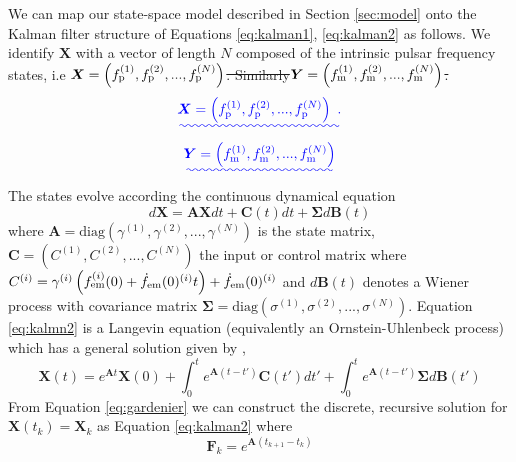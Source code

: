 \documentclass[fleqn,usenatbib,useAMS]{mnras}
\providecommand{\DIFadd}[1]{{\protect\color{blue}\uwave{#1}}} %
\providecommand{\DIFdel}[1]{{\protect\color{red}\sout{#1}}}                      %
\providecommand{\DIFaddbegin}{} %
\providecommand{\DIFaddend}{} %
\providecommand{\DIFdelbegin}{} %
\providecommand{\DIFdelend}{} %
\newcommand{\DIFscaledelfig}{0.5}
\newlength{\DIFdelgraphicswidth} %
\newlength{\DIFdelgraphicsheight} %
\newcommand{\DIFaddincludegraphics}[2][]{{\color{blue}\fbox{\DIFOincludegraphics[#1]{#2}}}} %
\newcommand{\DIFdelincludegraphics}[2][]{%
\sbox{\DIFdelgraphicsbox}{\DIFOincludegraphics[#1]{#2}}%
\settoboxwidth{\DIFdelgraphicswidth}{\DIFdelgraphicsbox} %
\settoboxtotalheight{\DIFdelgraphicsheight}{\DIFdelgraphicsbox} %
\scalebox{\DIFscaledelfig}{%
\parbox[b]{\DIFdelgraphicswidth}{\usebox{\DIFdelgraphicsbox}\\[-\baselineskip] \rule{\DIFdelgraphicswidth}{0em}}\llap{\resizebox{\DIFdelgraphicswidth}{\DIFdelgraphicsheight}{%
\setlength{\unitlength}{\DIFdelgraphicswidth}%
\begin{picture}(1,1)%
\thicklines\linethickness{2pt} %
{\color[rgb]{1,0,0}\put(0,0){\framebox(1,1){}}}%
{\color[rgb]{1,0,0}\put(0,0){\line( 1,1){1}}}%
{\color[rgb]{1,0,0}\put(0,1){\line(1,-1){1}}}%
\end{picture}%
}\hspace*{3pt}}} %
} %
\DeclareRobustCommand{\DIFaddbegin}{\DIFOaddbegin \let\includegraphics\DIFaddincludegraphics} %
\DeclareRobustCommand{\DIFaddend}{\DIFOaddend \let\includegraphics\DIFOincludegraphics} %
\DeclareRobustCommand{\DIFdelbegin}{\DIFOdelbegin \let\includegraphics\DIFdelincludegraphics} %
\DeclareRobustCommand{\DIFdelend}{\DIFOaddend \let\includegraphics\DIFOincludegraphics} %
\begin{document}
We can map our state-space model described in Section \ref{sec:model} onto the Kalman filter structure of Equations  
\eqref{eq:kalman1}, \eqref{eq:kalman2} as follows. We identify $\boldsymbol{X}$ with a vector of length $N$ composed of the intrinsic pulsar frequency states, i.e 
\DIFdelbegin \DIFdel{$\boldsymbol{X} = \left(f_{\rm p}^{(1)}, f_{\rm p}^{(2)}, ..., f_{\rm p}^{(N)}\right)$. Similarly$\boldsymbol{Y} = \left(f_{\rm m}^{(1)}, f_{\rm m}^{(2)}, ..., f_{\rm m}^{(N)} \right)$. }\DIFdelend \DIFaddbegin \begin{equation}
	\DIFadd{\boldsymbol{X} = \left(f_{\rm p}^{(1)}, f_{\rm p}^{(2)}, ..., f_{\rm p}^{(N)}\right) \ .
}\end{equation}
\DIFadd{Similarly,  
}\begin{equation}
\DIFadd{\boldsymbol{Y} = \left(f_{\rm m}^{(1)}, f_{\rm m}^{(2)}, ..., f_{\rm m}^{(N)} \right)
}\end{equation}
\DIFaddend The states evolve according the continuous dynamical equation
\begin{equation}
	d \boldsymbol{X} = \boldsymbol{A} \boldsymbol{X} dt + \boldsymbol{C}(t) dt + \boldsymbol{\Sigma} d \boldsymbol{B}(t) \label{eq:kalmn2}
\end{equation}
where $\boldsymbol{A} = \text{diag} \left(\gamma^{(1)}, \gamma^{(2)}, ..., \gamma^{(N)}\right)$ is the state matrix, $\boldsymbol{C} = \left(C^{(1)}, C^{(2)}, ..., C^{(N)}\right)$ the input or control matrix where $C^{(i)} =\gamma^{(i)} \left(f_{\rm em}^{(i)} (0) + \dot{f}_{\rm em}(0)^{(i)} t \right) +  \dot{f}_{\rm em}(0)^{(i)}$ and $d\boldsymbol{B}(t)$ denotes a Wiener process with covariance matrix $\boldsymbol{\Sigma} = \text{diag} \left(\sigma^{(1)}, \sigma^{(2)}, ..., \sigma^{(N)}\right)$. Equation \ref{eq:kalmn2} is a Langevin equation (equivalently an Ornstein-Uhlenbeck process) which has a general solution given by \citep{gardiner2009stochastic},
\begin{equation}
	\boldsymbol{X}(t) = e^{\boldsymbol{A} t} \boldsymbol{X}(0) + \int_0^t e^{\boldsymbol{A}(t-t')} \boldsymbol{C}(t') dt' + \int_0^t e^{\boldsymbol{A}(t-t')} \boldsymbol{\Sigma} d\boldsymbol{B}(t') \label{eq:gardenier}
\end{equation} 
From Equation \eqref{eq:gardenier} we can construct the discrete, recursive solution for $\boldsymbol{X}(t_k) = \boldsymbol{X}_k$ as Equation \eqref{eq:kalman2} where
\begin{equation}
\boldsymbol{F}_k = e^{\boldsymbol{A}\left( t_{k+1} - t_k \right)} 
\end{equation}
\end{document}
